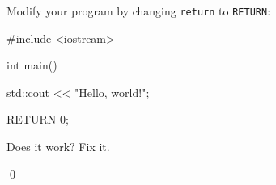 Modify your program by changing \verb!return! to \verb!RETURN!:

\begin{console}

#include <iostream>



int main()

{

    std::cout << "Hello, world!\n";



    RETURN 0;

}

\end{console}

Does it work? Fix it.

\qed

